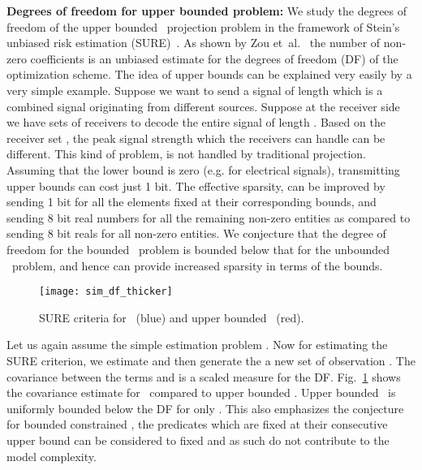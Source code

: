 \documentclass{article}
\def\etal{{et~al.}}
\def\Lo{~}
\begin{document}
\textbf{Degrees of freedom for upper bounded problem: }
We study the degrees of freedom of the upper bounded \Lo projection problem in the framework of Stein's unbiased risk estimation (SURE)~\cite{Stein81}. As shown by Zou \etal~\cite{Zou07} the number of non-zero coefficients is an unbiased estimate for the degrees of freedom (DF) of the optimization scheme.
The idea of upper bounds can be explained very easily by a very simple example. Suppose we want to send a signal of length  which is a combined signal originating from  different sources. Suppose at the receiver side we have  sets of receivers to decode the entire signal of length . Based on the receiver set , the peak signal strength which the receivers can handle can be different. This kind of problem, is not handled by traditional  projection. Assuming that the lower bound is zero (e.g. for electrical signals), transmitting upper bounds can cost just 1 bit. The effective sparsity, can be improved by sending 1 bit for all the elements fixed at their corresponding bounds, and sending 8 bit real numbers for all the remaining non-zero entities as compared to sending 8 bit reals for all non-zero entities. We conjecture that the degree of freedom for the bounded \Lo problem is bounded below that for the unbounded \Lo problem, and hence can provide increased sparsity in terms of the bounds.

\begin{figure}[ht!]
\centering
\texttt{[image: sim\_df\_thicker]}
\caption{SURE criteria for \Lo (blue) and upper bounded \Lo (red). \label{Fig:df}
}
\end{figure}
Let us again assume the simple estimation problem . Now for estimating the SURE criterion, we estimate  and then generate the a new set of observation . The covariance between the terms  and  is a scaled measure for the DF. Fig.~\ref{Fig:df} shows the covariance estimate for \Lo compared to upper bounded . Upper bounded \Lo is uniformly bounded below the DF for only . This also emphasizes the conjecture for bounded constrained , the predicates which are fixed at their consecutive upper bound can be considered to fixed and as such do not contribute to the model complexity.
\end{document}
